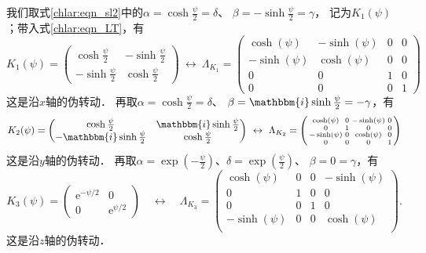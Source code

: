 我们取式\eqref{chlar:eqn_sl2}中的$\alpha=\cosh \frac{\psi}{2}=\delta$、
$\beta=-\sinh \frac{\psi}{2}=\gamma$，
记为$K_1(\psi)$；带入式\eqref{chlar:eqn_LT}，有
\begin{equation}\label{chlar:eqn_sL2-x}
    K_1(\psi)=\begin{pmatrix}
        \cosh \frac{\psi}{2} & -\sinh \frac{\psi}{2} \\
        -\sinh \frac{\psi}{2} & \cosh \frac{\psi}{2}
    \end{pmatrix}
    \ \leftrightarrow \
    \Lambda_{K_1}=\left(\begin{smallmatrix}
            \cosh (\psi ) & -\sinh (\psi ) & 0 & 0 \\
            -\sinh (\psi ) & \cosh (\psi ) & 0 & 0 \\
            0 & 0 & 1 & 0 \\
            0 & 0 & 0 & 1 
    \end{smallmatrix} \right)
\end{equation}
这是沿$x$轴的伪转动．
再取$\alpha=\cosh \frac{\psi}{2}=\delta$、
$ \beta=\mathbbm{i}\sinh \frac{\psi}{2}=-\gamma$，有
\begin{equation}\label{chlar:eqn_sL2-y}
    K_2(\psi)=\begin{pmatrix}
        \cosh \frac{\psi}{2} & \mathbbm{i} \sinh \frac{\psi}{2} \\
        -\mathbbm{i} \sinh \frac{\psi}{2} & \cosh \frac{\psi}{2}
    \end{pmatrix}
    \ \leftrightarrow \
    \Lambda_{K_2}=\left(\begin{smallmatrix}
            \cosh (\psi ) & 0 & -\sinh (\psi ) & 0 \\
            0 & 1 & 0 & 0 \\
            -\sinh (\psi ) & 0 & \cosh (\psi ) & 0 \\
            0 & 0 & 0 & 1 \\
    \end{smallmatrix} \right)
\end{equation}
这是沿$y$轴的伪转动．
再取$\alpha=\exp(-\frac{\psi}{2})$、$ \delta=\exp(\frac{\psi}{2})$、
$\beta=0=\gamma$，有
\begin{equation}\label{chlar:eqn_sL2-z}
    K_3(\psi)= \begin{pmatrix}
        \mathrm{e}^{-\psi / 2} & 0 \\
        0 & \mathrm{e}^{\psi / 2}
    \end{pmatrix}
    \quad \leftrightarrow \quad
    \Lambda_{K_3}=\left(\begin{smallmatrix}
            \cosh (\psi ) & 0 & 0 & -\sinh (\psi ) \\
            0 & 1 & 0 & 0 \\
            0 & 0 & 1 & 0 \\
            -\sinh (\psi ) & 0 & 0 & \cosh (\psi ) \\
   \end{smallmatrix} \right) .
\end{equation}
这是沿$z$轴的伪转动．








